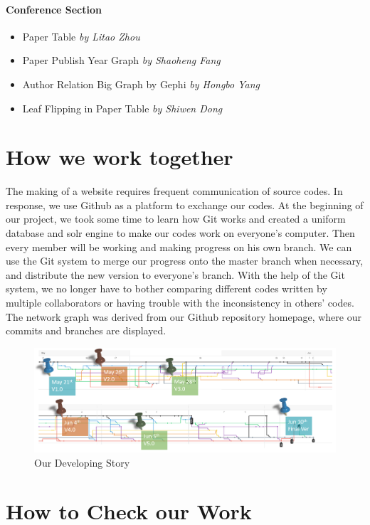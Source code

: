 \documentclass{book}
\begin{document}
\paragraph{Conference Section}
\begin{itemize}
\item Paper Table \textit{by Litao Zhou}
\item Paper Publish Year Graph \textit{by Shaoheng Fang}
\item Author Relation Big Graph by Gephi \textit{by Hongbo Yang}
\item Leaf Flipping in Paper Table \textit{by Shiwen Dong}
\end{itemize}


\section* {How we work together}

The making of a website requires frequent communication of source codes. In response, we use Github as a platform to exchange our codes. At the beginning of our project, we took some time to learn how Git works and created a uniform database and solr engine to make our codes work on everyone's computer. Then every member will be working and making progress on his own branch. We can use the Git system to merge our progress onto the master branch when necessary, and distribute the new version to everyone's branch. With the help of the Git system, we no longer have to bother comparing different codes written by multiple collaborators or having trouble with the inconsistency in others' codes. The network graph was derived from our Github repository homepage, where our commits and branches are displayed.

\begin{figure}[H]
\centering
\includegraphics[scale=0.25]{img/zlt_pre_2.png}
\caption{Our Developing Story}
\end{figure}

\section* {How to Check our Work}
\end{document}
